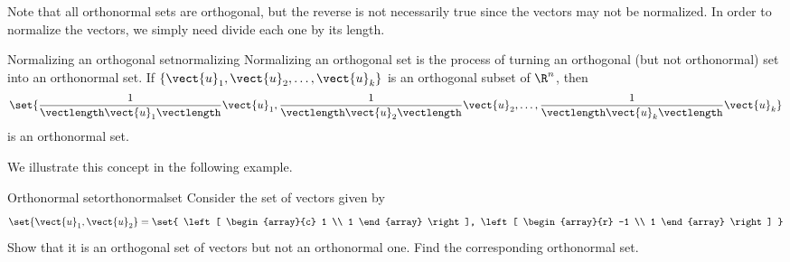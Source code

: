 Note that all orthonormal sets are orthogonal, but the reverse is not
necessarily true since the vectors may not be normalized. In order to
normalize the vectors, we simply need divide each one by its length.

\begin{definition}{Normalizing an orthogonal set}{normalizing}
Normalizing an orthogonal set is the process of 
turning an orthogonal (but not orthonormal) set into
an orthonormal set.
If $\{\vect{u}_1, \vect{u}_2, \ldots, \vect{u}_k\}$
is an orthogonal subset of $\R^n$, 
then 
\[ \set{
\frac{1}{\vectlength\vect{u}_1\vectlength}\vect{u}_1,
\frac{1}{\vectlength\vect{u}_2\vectlength}\vect{u}_2, \ldots,
\frac{1}{\vectlength\vect{u}_k\vectlength}\vect{u}_k }
\]
is an orthonormal set.
\end{definition}

We illustrate this concept in the following example. 

\begin{example}{Orthonormal set}{orthonormalset}
Consider the set of vectors  given by 
\[
\set{\vect{u}_1, \vect{u}_2 } = \set{
\left[
\begin{array}{c}
1 \\
1 
\end{array}
\right], 
\left[
\begin{array}{r}
-1 \\
1
\end{array}
\right]
}
\]
Show that it is an orthogonal set of vectors  but not an orthonormal one. Find the corresponding orthonormal set. 
\end{example}


